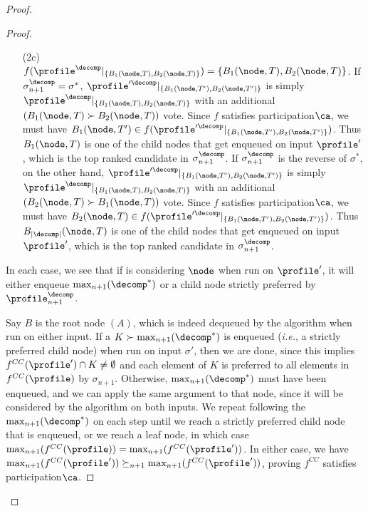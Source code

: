 \begin{proof}
\begin{proof}
\begin{enumerate}
\begin{enumerate}
            \item[(2c)] $f(\profile^{\decomp}|_{\{B_1(\node, T), B_2(\node,T)\}})=\{B_1(\node,T),B_2(\node,T)\}$. If $\sigma_{n+1}^\decomp=\sigma^*$, $\profile'^{\decomp}|_{\{B_1(\node, T'), B_2(\node,T')\}}$ is simply $\profile^{\decomp}|_{\{B_1(\node, T), B_2(\node,T)\}}$ with an additional $(B_1(\node, T) \succ B_2(\node, T))$ vote. Since $f$ satisfies participation$\ca$, we must have $B_1(\node,T') \in f(\profile'^{\decomp}|_{\{B_1(\node, T'), B_2(\node,T')\}})$. Thus $B_{1}(\node,T)$ is one of the child nodes that get enqueued on input $\profile'$, which is the top ranked candidate in $\sigma^\decomp_{n+1}$. If $\sigma_{n+1}^\decomp$ is the reverse of $\sigma^*$, on the other hand, $\profile'^{\decomp}|_{\{B_1(\node, T'), B_2(\node,T')\}}$ is simply $\profile^{\decomp}|_{\{B_1(\node, T), B_2(\node,T)\}}$ with an additional $(B_2(\node, T) \succ B_1(\node, T))$ vote. Since $f$ satisfies participation$\ca$, we must have $B_2(\node,T)\in f(\profile'^{\decomp}|_{\{B_1(\node, T'), B_2(\node,T')\}})$. Thus $B_{|\decomp|}(\node,T)$ is one of the child nodes that get enqueued on input $\profile'$, which is the top ranked candidate in $\sigma^\decomp_{n+1}$.
        \end{enumerate}
    \end{enumerate}
    
    In each case, we see that if  is considering $\node$ when run on $\profile'$, it will either enqueue $\max_{n+1}(\decomp^*)$ or a child node strictly preferred by $\profile^\decomp_{n+1}$. 
    
    Say $B$ is the root node $(A)$, which is indeed dequeued by the algorithm  when run on either input. If a $K \succ \max_{n+1}(\decomp^*)$ is enqueued (\emph{i.e.}, a strictly preferred child node) when run on input $\sigma'$, then we are done, since this implies $f^{CC}(\profile') \cap K \neq \emptyset$ and each element of $K$ is preferred to all elements in $f^{CC}(\profile)$ by $\sigma_{n+1}$. Otherwise,  $\max_{n+1}(\decomp^*)$ must have been enqueued, and we can apply the same argument to that node, since it will be considered by the algorithm on both inputs. We repeat following the $\max_{n+1}(\decomp^*)$ on each step until we reach a strictly preferred child node that is enqueued, or we reach a leaf node, in which case $\max_{n+1}(f^{CC}(\profile))= \max_{n+1}(f^{CC}(\profile'))$. In either case, we have $\max_{n+1}(f^{CC}(\profile')) \succeq_{n+1} \max_{n+1}(f^{CC}(\profile'))$, proving $f^{CC}$ satisfies participation$\ca$. 
    \end{proof}    


\end{proof}

